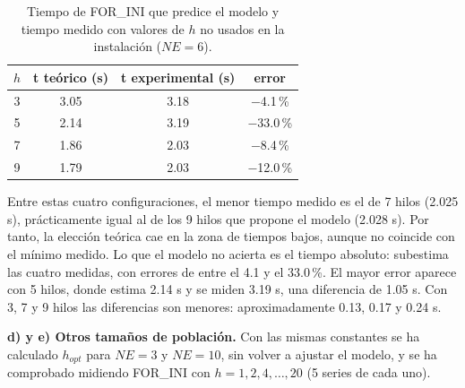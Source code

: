 \documentclass[12pt]{article}
\begin{document}
\begin{enumerate}
\begin{table}[htbp]
\centering
\begin{tabular}{c|ccc}
\toprule
\textbf{$h$} & \textbf{t teórico (s)} & \textbf{t experimental (s)} & \textbf{error} \\
\midrule
3 & 3.05 & 3.18 & $-$4.1\,\% \\
5 & 2.14 & 3.19 & $-$33.0\,\% \\
7 & 1.86 & 2.03 & $-$8.4\,\% \\
9 & 1.79 & 2.03 & $-$12.0\,\% \\
\bottomrule
\end{tabular}
\caption{Tiempo de FOR\_INI que predice el modelo y tiempo medido con valores de $h$ no usados en la instalación ($NE = 6$).}
\label{tab:c3_prediccion}
\end{table}

Entre estas cuatro configuraciones, el menor tiempo medido es el de 7 hilos (2.025 s), prácticamente igual al de los 9 hilos que propone el modelo (2.028 s). Por tanto, la elección teórica cae en la zona de tiempos bajos, aunque no coincide con el mínimo medido. Lo que el modelo no acierta es el tiempo absoluto: subestima las cuatro medidas, con errores de entre el 4.1 y el 33.0\,\%. El mayor error aparece con 5 hilos, donde estima 2.14 s y se miden 3.19 s, una diferencia de 1.05 s. Con 3, 7 y 9 hilos las diferencias son menores: aproximadamente 0.13, 0.17 y 0.24 s.

\textbf{d) y e) Otros tamaños de población.} Con las mismas constantes se ha calculado $h_{opt}$ para $NE = 3$ y $NE = 10$, sin volver a ajustar el modelo, y se ha comprobado midiendo FOR\_INI con $h = 1, 2, 4, \dots, 20$ (5 series de cada uno).


\end{enumerate}
\end{document}
